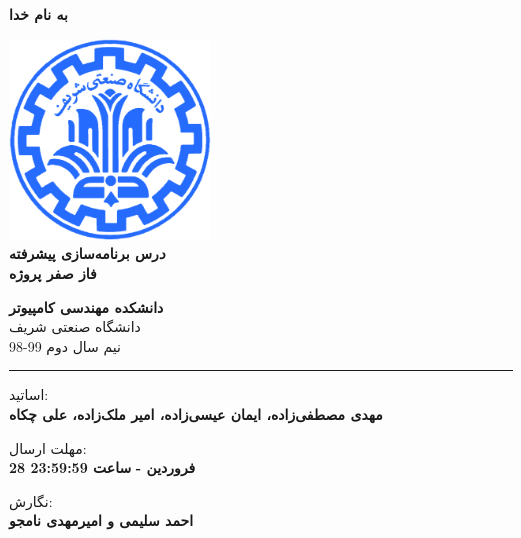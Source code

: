 \documentclass[]{article}
\begin{document}
\begin{titlepage}
\begin{center}

\textbf{ \Huge{به نام خدا} }
        
\vspace{0.2cm}

\includegraphics[width=0.4\textwidth]{sharif1.png}\\
\vspace{0.2cm}
\textbf{ \Huge{\emph درس برنامه‌سازی پیشرفته} }\\
\vspace{0.25cm}
\textbf{ \Large{ فاز صفر پروژه} }
\vspace{0.2cm}
       
 
      \large \textbf{دانشکده مهندسی کامپیوتر}\\\vspace{0.1cm}
    \large   دانشگاه صنعتی شریف\\\vspace{0.2cm}
       \large   ﻧﯿﻢ سال دوم 99-98 \\\vspace{0.10cm}
      \noindent\rule[1ex]{\linewidth}{1pt}
اساتید:\\
    \textbf{{مهدی مصطفی‌زاده، ایمان عیسی‌زاده، امیر ملک‌زاده، علی چکاه}}



    \vspace{0.20cm}

   مهلت ارسال:\\
    \textbf{{28 فروردین - }}
    \textbf{{ساعت 23:59:59}}

    \vspace{0.10cm}
نگارش:\\
    \textbf{{احمد سلیمی و امیرمهدی نامجو}}
    

\end{center}
\end{titlepage}


\newpage
\pagestyle{fancy}
\fancyhf{}
\fancyfoot{}
\cfoot{\thepage}
\renewcommand{\headrulewidth}{2pt}
\end{document}
